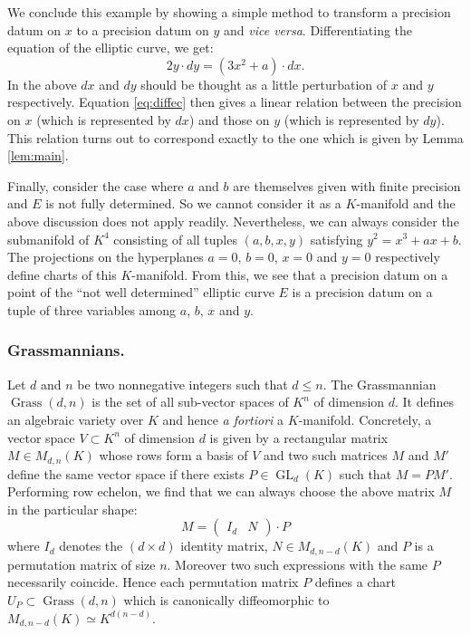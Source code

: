 \documentclass{lms}
\DeclareMathOperator{\GL}{GL}
\DeclareMathOperator{\Grass}{Grass}
\begin{document}
We conclude this example by showing a simple method to transform a
precision datum on $x$ to a precision datum on $y$ and \emph{vice versa}.
Differentiating the equation of the elliptic curve, we get:
\begin{equation}
\label{eq:diffec}
2 y \cdot dy = (3 x^2 + a) \cdot dx.
\end{equation}
In the above $dx$ and $dy$ should be thought as a little perturbation of 
$x$ and $y$ respectively. Equation \eqref{eq:diffec} then gives a linear 
relation between the precision on $x$ (which is represented by $dx$) and 
those on $y$ (which is represented by $dy$). This relation turns out to
correspond exactly to the one which is given by Lemma \ref{lem:main}.

Finally, consider the case where $a$ and $b$ are themselves given with 
finite precision and $E$ is not fully determined. So 
we cannot consider it as a $K$-manifold and the above discussion does not 
apply readily. Nevertheless, we can always consider the submanifold of 
$K^4$ consisting of all tuples $(a,b,x,y)$ satisfying $y^2 = x^3 + a x + 
b$. The projections on the hyperplanes $a = 0$, $b = 0$, $x = 0$ and $y = 
0$ respectively define charts of this $K$-manifold. From this, we see 
that a precision datum on a point of the ``not well determined'' elliptic 
curve $E$ is a precision datum on a tuple of three variables among $a$, 
$b$, $x$ and $y$.

\subsubsection*{Grassmannians.}

Let $d$ and $n$ be two nonnegative integers such that $d \leq n$. The 
Grassmannian $\Grass(d,n)$ is the set of all sub-vector spaces of $K^n$ 
of dimension $d$. It defines an algebraic variety over $K$ and hence
\emph{a fortiori} a $K$-manifold.
Concretely, a vector space $V \subset K^n$ of dimension $d$ is given by 
a rectangular matrix $M \in M_{d,n}(K)$ whose rows form a basis of $V$ 
and two such matrices $M$ and $M'$ define the same vector space if there 
exists $P \in \GL_d(K)$ such that $M = P M'$. Performing row echelon, we 
find that we can always choose the above matrix $M$ in the particular
shape:
\begin{equation}
\label{eq:grass}
M = \begin{pmatrix} I_d & N \end{pmatrix} \cdot P
\end{equation}
where $I_d$ denotes the $(d \times d)$ identity matrix, $N \in M_{d, 
n-d}(K)$ and $P$ is a permutation matrix of size $n$. Moreover two 
such expressions with the same $P$ necessarily coincide. Hence each 
permutation matrix $P$ defines a chart $U_P \subset \Grass(d,n)$ which
is canonically diffeomorphic to $M_{d, n-d}(K) \simeq K^{d(n-d)}$.
\end{document}
